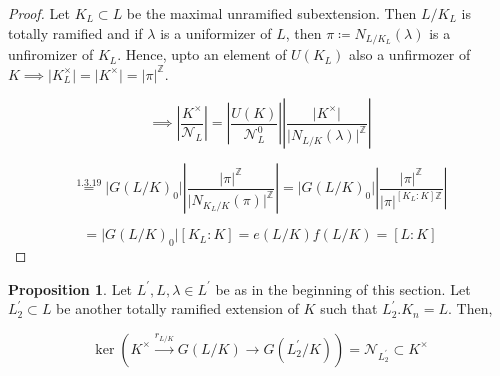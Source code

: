 \documentclass{article}
\theoremstyle{definition}
\numberwithin{theorem}{subsection}
\newtheorem{proposition}[theorem]{Proposition}
\begin{document}
    \begin{proof}
        Let \(K_L \subset L\) be the maximal unramified subextension. Then \(L / K_L\) is totally ramified and if \(\lambda\) is a uniformizer of \(L\), then \(\pi \coloneqq N_{L / K_L}(\lambda)\) is a unfiromizer of \(K_L\). Hence, upto an element of \(U(K_L)\) also a unfirmozer of \(K \implies \vert K_L^\times \vert = \vert K^\times \vert = \vert \pi \vert^\mathbb{Z}\).
        
        \[
            \implies \left\vert \frac{K^\times}{\mathcal{N}_L} \right\vert = \left\vert \frac{U(K)}{\mathcal{N}_L^0} \right\vert \left\vert \frac{\vert K^\times \vert}{\vert N_{L / K}(\lambda) \vert^{\mathbb{Z}}} \right\vert 
        \]

        \[
            \overset{1.3.19}{=} \vert G(L / K)_0 \vert \left\vert \frac{\vert \pi \vert ^\mathbb{Z}}{\vert N_{K_L / K}(\pi) \vert ^\mathbb{Z}} \right\vert = \vert G(L / K)_0 \vert \left\vert \frac{\vert \pi \vert ^\mathbb{Z}}{\vert \pi \vert ^{[K_L : K]\mathbb{Z}}} \right\vert 
        \]

        \[
            = \vert G(L / K)_0 \vert [K_L : K] = e(L / K) f(L / K) = [L : K]
        \]
    \end{proof}

    \begin{proposition}
        Let \(L^{\prime}, L, \lambda \in L^{\prime}\) be as in the beginning of this section. Let \(L_2^{\prime} \subset L\) be another totally ramified extension of \(K\) such that \(L_2^{\prime} . K_n = L\). Then,

        \[
            \ker(K^\times \xrightarrow{r_{L / K}} G(L / K) \to G(L_2^{\prime} / K)) = \mathcal{N}_{L_2^{\prime}} \subset K^\times
        \]
    \end{proposition}
\end{document}
